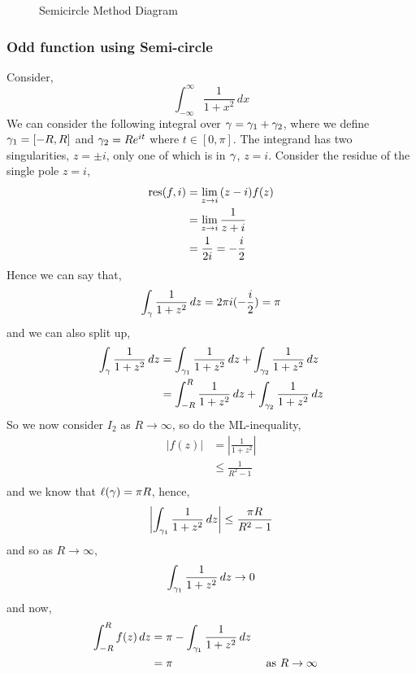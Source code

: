 \documentclass{article}
\begin{document}
\begin{figure}[!ht]
  \centering
  \caption{Semicircle Method Diagram}
\end{figure}

\subsubsection{Odd function using Semi-circle}

Consider,
$$ \int_{-\infty}^\infty { \frac{1}{1 + x^2}\,dx} $$
We can consider the following integral over $\gamma = \gamma_1 + \gamma_2$, where we define $\gamma_1 = [-R, R]$ and $\gamma_2 = Re^{it}$ where $t \in [0, \pi]$. The integrand has two singularities, $z = \pm i$, only one of which is in $\gamma$, $z = i$. Consider the residue of the single pole $z = i$,
\begin{align*}
  \operatorname*{res} (f, i) &= \lim_{z \to i} {(z - i)f(z)} \\
  &= \lim_{z \to i} \frac{1}{z + i}\\
  &= \frac{1}{2i} = -\frac{i}{2}
\end{align*}
Hence we can say that,
$$ \int_\gamma \frac{1}{1 + z^2}\,dz = 2\pi i (-\frac{i}{2}) = \pi $$
and we can also split up,
\begin{align*}
  \int_\gamma \frac{1}{1 + z^2}\,dz &= \int_{\gamma_1} \frac{1}{1 + z^2}\,dz + \int_{\gamma_2} \frac{1}{1 + z^2}\,dz\\
  &= \int_{-R}^R \frac{1}{1 + z^2}\,dz + \int_{\gamma_2} \frac{1}{1 + z^2}\,dz\\
\end{align*}
So we now consider $I_2$ as $R \to \infty$, so do the ML-inequality,
\begin{align*}
  |f(z)| &= \left | \frac{1}{1 + z^2} \right | \\
  &\le \frac{1}{R^2 - 1}\\
\end{align*}
and we know that $\ell (\gamma) = \pi R$, hence,
$$ \left|\int_{\gamma_1} \frac{1}{1 + z^2}\,dz \right| \le \frac{\pi R}{R^2 - 1} $$
and so as $R \to \infty$,
$$ \int_{\gamma_1} \frac{1}{1 + z^2}\,dz \to 0 $$
and now,
\begin{align*}
  \int_{-R}^R {f(z)}\, dz &= \pi - \int_{\gamma_1} \frac{1}{1 + z^2}\,dz\\
  &= \pi && \text{ as $R \to \infty$}
\end{align*}
\end{document}
